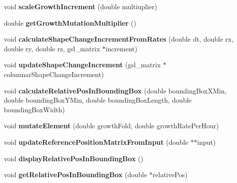 \begin{DoxyCompactItemize}
\item 
\hypertarget{classShapeBase_a33c8d69e858be0ad6414f4f5f64eeb3b}{}void {\bfseries scale\+Growth\+Increment} (double multiuplier)\label{classShapeBase_a33c8d69e858be0ad6414f4f5f64eeb3b}

\item 
\hypertarget{classShapeBase_a62ed1f44e3cd14f58ddbbb332064f1ee}{}double {\bfseries get\+Growth\+Mutation\+Multiplier} ()\label{classShapeBase_a62ed1f44e3cd14f58ddbbb332064f1ee}

\item 
\hypertarget{classShapeBase_a2423a7dd85ab25b7eb38b5a954d732ab}{}void {\bfseries calculate\+Shape\+Change\+Increment\+From\+Rates} (double dt, double rx, double ry, double rz, gsl\+\_\+matrix $\ast$increment)\label{classShapeBase_a2423a7dd85ab25b7eb38b5a954d732ab}

\item 
\hypertarget{classShapeBase_ab057fa6a1189b6bed5ac9201fc6ca620}{}void {\bfseries update\+Shape\+Change\+Increment} (gsl\+\_\+matrix $\ast$columnar\+Shape\+Change\+Increment)\label{classShapeBase_ab057fa6a1189b6bed5ac9201fc6ca620}

\item 
\hypertarget{classShapeBase_a04278729ad9cc3238b1966ade0685a3d}{}void {\bfseries calculate\+Relative\+Pos\+In\+Bounding\+Box} (double bounding\+Box\+X\+Min, double bounding\+Box\+Y\+Min, double bounding\+Box\+Length, double bounding\+Box\+Width)\label{classShapeBase_a04278729ad9cc3238b1966ade0685a3d}

\item 
\hypertarget{classShapeBase_af39a584fa424f92b219d0ad903439ae7}{}void {\bfseries mutate\+Element} (double growth\+Fold, double growth\+Rate\+Per\+Hour)\label{classShapeBase_af39a584fa424f92b219d0ad903439ae7}

\item 
\hypertarget{classShapeBase_acf601cf9b007a1e001b01fb5ed84399a}{}void {\bfseries update\+Reference\+Position\+Matrix\+From\+Input} (double $\ast$$\ast$input)\label{classShapeBase_acf601cf9b007a1e001b01fb5ed84399a}

\item 
\hypertarget{classShapeBase_ae5e17514271f121498ed12cebae3aebe}{}void {\bfseries display\+Relative\+Pos\+In\+Bounding\+Box} ()\label{classShapeBase_ae5e17514271f121498ed12cebae3aebe}

\item 
\hypertarget{classShapeBase_a0d33afa938cd84b1376806a06769f6b9}{}void {\bfseries get\+Relative\+Pos\+In\+Bounding\+Box} (double $\ast$relative\+Pos)\label{classShapeBase_a0d33afa938cd84b1376806a06769f6b9}


\end{DoxyCompactItemize}
